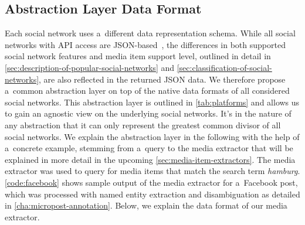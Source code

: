 \subsection{Abstraction Layer Data Format}
\label{sec:data-format}

Each social network uses a~different data representation schema.
While all social networks with API access are
JSON-based~\cite{crockford2006json}, the differences in both 
supported social network features and media item support level,
outlined in detail in
\autoref{sec:description-of-popular-social-networks} and
\autoref{sec:classification-of-social-networks},
are also reflected in the returned JSON data.
We therefore propose a~common abstraction layer 
on top of the native data formats of all considered social networks.
This abstraction layer is outlined in \autoref{tab:platforms}
and allows us to gain
an agnostic view on the underlying social networks.
It's in the nature of any abstraction
that it can only represent the
greatest common divisor of all social networks.
We explain the abstraction layer in the following
with the help of a~concrete example,
stemming from a~query to the media extractor
that will be explained in more detail
in the upcoming \autoref{sec:media-item-extractors}.
The media extractor was used to query for media items
that match the search term \emph{hamburg}.
\autoref{code:facebook} shows sample output of the media extractor
for a~Facebook post, which was processed
with named entity extraction and disambiguation 
as detailed in \autoref{cha:micropost-annotation}.
Below, we explain the data format of our media extractor.

